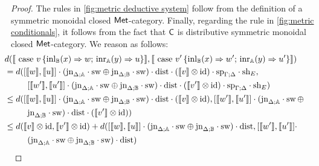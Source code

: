 \begin{proof}
   The rules in \autoref{fig:metric deductive system} follow from the definition of a symmetric monoidal closed $\mathsf{Met}$-category. Finally, regarding  the rule in  \autoref{fig:metric conditionals}, it follows from the fact that $\mathsf{C}$ is distributive symmetric monoidal closed $\mathsf{Met}$-category. We reason as follows:
  \begin{align*}
    & \hspace{-20pt} d( \llbracket  \text{ case } v \, \{\text{inl}_{\typeB}  (x) \Rightarrow w ; \, \text{inr}_{\typeA} (y) \Rightarrow u\}  \rrbracket, \llbracket \text{ case } v' \, \{\text{inl}_{\typeB}  (x) \Rightarrow w' ; \, \text{inr}_{\typeA} (y) \Rightarrow u'\} \rrbracket)  \\
    &  \hspace{-20pt} = d( [\llbracket w\rrbracket ,\llbracket u\rrbracket] \comp (\text{jn}_{\Delta;\typeA}\comp \sw \oplus \text{jn}_{\Delta;\typeB}\comp \sw) \comp \dist \comp (\llbracket v\rrbracket \otimes \text{id}) \comp \text{sp}_{\Gamma;\Delta} \comp \text{sh}_{E}, \\
    & \hspace{7pt} [\llbracket w'\rrbracket ,\llbracket u'\rrbracket] \comp (\text{jn}_{\Delta;\typeA}\comp \sw \oplus \text{jn}_{\Delta;\typeB}\comp \sw) \comp \dist \comp (\llbracket v'\rrbracket \otimes \text{id}) \comp \text{sp}_{\Gamma;\Delta} \comp \text{sh}_{E})\\
    & \hspace{-20pt} \leq  d( [\llbracket w\rrbracket ,\llbracket u\rrbracket] \comp (\text{jn}_{\Delta;\typeA}\comp \sw \oplus \text{jn}_{\Delta;\typeB}\comp \sw) \comp \dist \comp (\llbracket v\rrbracket \otimes \text{id}),  [\llbracket w'\rrbracket ,\llbracket u'\rrbracket] \comp (\text{jn}_{\Delta;\typeA}\comp \sw \, \oplus \\
    & \hspace{7pt}  \text{jn}_{\Delta;\typeB}\comp \sw) \comp \dist \comp (\llbracket v'\rrbracket \otimes \text{id}) )\\
    & \hspace{-20pt} \leq  d(\llbracket v\rrbracket \otimes \text{id}, \llbracket v'\rrbracket \otimes \text{id}) +  d( [\llbracket w\rrbracket ,\llbracket u\rrbracket] \comp (\text{jn}_{\Delta;\typeA}\comp \sw \oplus \text{jn}_{\Delta;\typeB}\comp \sw) \comp \dist,  [\llbracket w'\rrbracket ,\llbracket u'\rrbracket]\comp \\
    & \hspace{7pt} (\text{jn}_{\Delta;\typeA}\comp \sw \oplus \text{jn}_{\Delta;\typeB}\comp \sw) \comp \dist) \\

\end{align*}
\end{proof}
